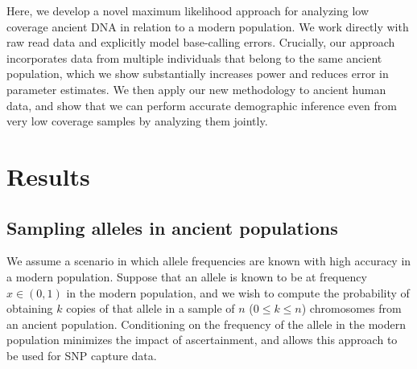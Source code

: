 \documentclass[11pt, oneside]{article}   	%
\begin{document}
Here, we develop a novel maximum likelihood approach for analyzing low coverage ancient DNA in relation to a modern population. We work directly with raw read data and explicitly model base-calling errors. Crucially, our approach incorporates data from multiple individuals that belong to the same ancient population, which we show substantially increases power and reduces error in parameter estimates. We then apply our new methodology to ancient human data, and show that we can perform accurate demographic inference even from very low coverage samples by analyzing them jointly. 

\section{Results}
\subsection{Sampling alleles in ancient populations}
We assume a scenario in which allele frequencies are known with high accuracy in a modern population. Suppose that an allele is known to be at frequency $x \in (0, 1)$ in the modern population, and we wish to compute the probability of obtaining $k$ copies of that allele in a sample of $n$ ($0 \leq k \leq n$) chromosomes from an ancient population. Conditioning on the frequency of the allele in the modern population minimizes the impact of ascertainment, and allows this approach to be used for SNP capture data. 
\end{document}
